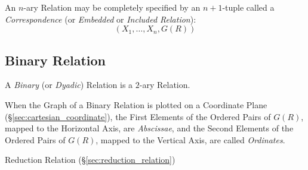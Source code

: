 An $n$-ary Relation may be completely specified by an $n + 1$-tuple
called a \emph{Correspondence} (or \emph{Embedded} or \emph{Included
  Relation}):
\[
  (X_1, \ldots, X_n, G(R))
\]



\subsection{Binary Relation}\label{sec:binary_relation}

A \emph{Binary} (or \emph{Dyadic}) Relation is a $2$-ary Relation.

When the Graph of a Binary Relation is plotted on a Coordinate Plane
(\S\ref{sec:cartesian_coordinate}), the First Elements of the Ordered
Pairs of $G(R)$, mapped to the Horizontal Axis, are \emph{Abscissae},
and the Second Elements of the Ordered Pairs of $G(R)$, mapped to the
Vertical Axis, are called \emph{Ordinates}.

Reduction Relation (\S\ref{sec:reduction_relation})

